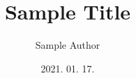 \documentclass[10pt,oneside]{book}
\newcommand{\titletext}[0]{Sample Title}
\newcommand{\authorname}[0]{Sample Author}
\newcommand{\backupdate}[0]{2021. 01. 17.}
\begin{document}
\title{\Huge{\titletext}}
\author{\authorname}
\date{\backupdate}

\maketitle
\tableofcontents

\end{document}
